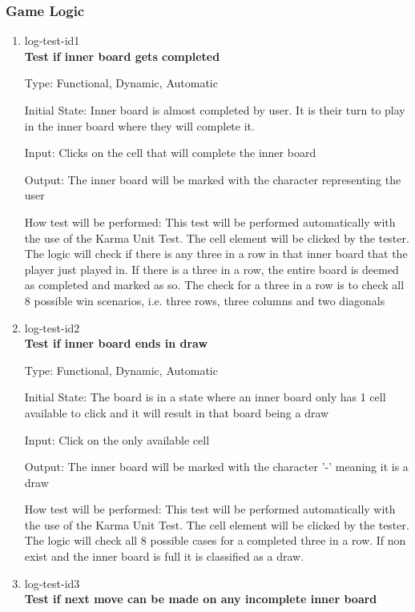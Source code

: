 \documentclass[12pt, titlepage]{article}
\begin{document}
\subsubsection{Game Logic}

\begin{enumerate}

\item{log-test-id1\\}
\textbf{Test if inner board gets completed}

Type: Functional, Dynamic, Automatic
					
Initial State: Inner board is almost completed by user. It is their turn to
play in the inner board where they will complete it.
					
Input: Clicks on the cell that will complete the inner board
					
Output: The inner board will be marked with the character representing the
user
					
How test will be performed: This test will be performed automatically with the
use of the Karma Unit Test. The cell element will be clicked by the tester.
The logic will check if there is any three in a row in that inner board that
the player just played in. If there is a three in a row, the entire board is
deemed as completed and marked as so. The check for a three in a row is to
check all 8 possible win scenarios, i.e. three rows, three columns and two
diagonals

\item{log-test-id2\\}
\textbf{Test if inner board ends in draw}

Type: Functional, Dynamic, Automatic
					
Initial State: The board is in a state where an inner board only has 1 cell
available to click and it will result in that board being a draw

Input: Click on the only available cell
					
Output: The inner board will be marked with the character '-' meaning it is a
draw
					
How test will be performed: This test will be performed automatically with the
use of the Karma Unit Test. The cell element will be clicked by the tester.
The logic will check all 8 possible cases for a completed three in a row. If
non exist and the inner board is full it is classified as a draw.

\item{log-test-id3\\}
\textbf{Test if next move can be made on any incomplete inner board}


\end{enumerate}
\end{document}
